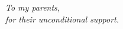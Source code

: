 {}

\vspace*{3cm}

\begingroup
\setlength{\parindent}{0cm}
\textit{To my parents,\\
\hspace*{5mm}for their unconditional support.}
\endgroup

